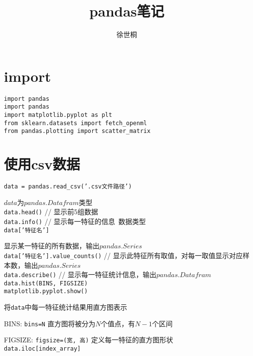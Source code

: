\documentclass[UTF8]{ctexart}
\title{pandas笔记}
\author{徐世桐}
\date{}
\begin{document}
\maketitle

\section{import}
\noindent \texttt{import pandas}\\
\texttt{import pandas}\\
\texttt{import matplotlib.pyplot as plt}\\
\texttt{from sklearn.datasets import fetch\_openml}\\
\texttt{from pandas.plotting import scatter\_matrix}
\section{使用csv数据}
\noindent \texttt{data = pandas.read\_csv('.csv文件路径')}

  $data$为$pandas.Datafram$类型\\
\texttt{data.head()} // 显示前5组数据\\
\texttt{data.info()} // 显示每一特征的信息\ 数据类型\\
\texttt{data['特征名']} 
  
  显示某一特征的所有数据，输出$pandas.Series$\\
\texttt{data['特征名'].value\_counts()} // 显示此特征所有取值，对每一取值显示对应样本数，输出$pandas.Series$\\
\texttt{data.describe()} // 显示每一特征统计信息，输出$pandas.Datafram$\\
\texttt{data.hist(BINS, FIGSIZE)}\\
\texttt{matplotlib.pyplot.show()}

  将\texttt{data}中每一特征统计结果用直方图表示

  BINS: \texttt{bins=N} 直方图将被分为$N$个值点，有$N-1$个区间

  FIGSIZE: \texttt{figsize=(宽, 高)} 定义每一特征的直方图形状\\
\texttt{data.iloc[index\_array]}
\end{document}
